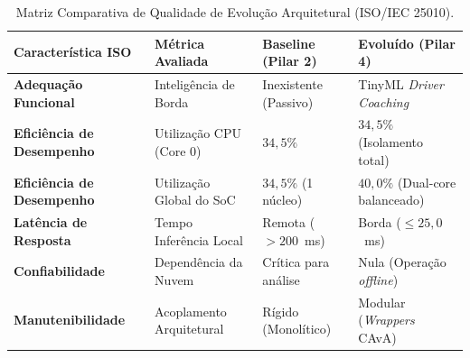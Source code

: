 \begin{table}[htbp]
\centering
\footnotesize
\caption{Matriz Comparativa de Qualidade de Evolução Arquitetural (ISO/IEC 25010).}
\label{tab:iso25010_comparada}
\setlength{\tabcolsep}{4.5pt}
\renewcommand{\arraystretch}{1.2}
\begin{tabularx}{\textwidth}{@{} >{\raggedright\arraybackslash}p{3.2cm} >{\raggedright\arraybackslash}p{3.4cm} >{\raggedright\arraybackslash}X >{\raggedright\arraybackslash}X @{}}
\toprule
\textbf{Característica ISO} & \textbf{Métrica Avaliada} & \textbf{Baseline (Pilar 2)} & \textbf{Evoluído (Pilar 4)} \\
\midrule
\textbf{Adequação Funcional} & Inteligência de Borda & Inexistente (Passivo) & TinyML \textit{Driver Coaching} \\
\textbf{Eficiência de Desempenho} & Utilização CPU (Core 0) & $34{,}5\%$ & $34{,}5\%$ (Isolamento total) \\
\textbf{Eficiência de Desempenho} & Utilização Global do SoC & $34{,}5\%$ (1 núcleo) & $40{,}0\%$ (Dual-core balanceado) \\
\textbf{Latência de Resposta} & Tempo Inferência Local & Remota ($> 200$~ms) & Borda ($\le 25{,}0$~ms) \\
\textbf{Confiabilidade} & Dependência da Nuvem & Crítica para análise & Nula (Operação \textit{offline}) \\
\textbf{Manutenibilidade} & Acoplamento Arquitetural & Rígido (Monolítico) & Modular (\textit{Wrappers} CAvA) \\
\bottomrule
\end{tabularx}
\end{table}
